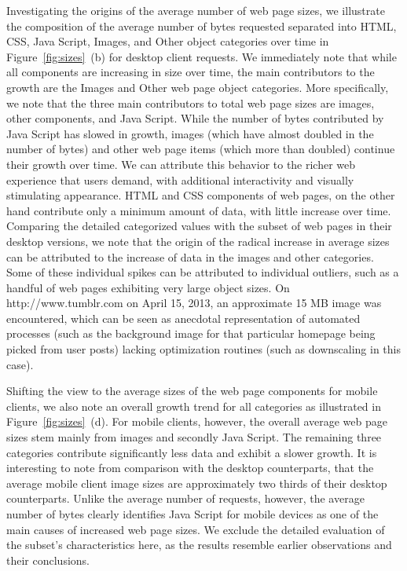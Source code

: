 \documentclass[journal,final]{IEEEtran}
\begin{document}
Investigating the origins of the average number of web page sizes, we illustrate the composition of the average number of bytes requested separated into HTML, CSS, Java Script, Images, and Other object categories over time in Figure~\ref{fig:sizes}~(b) for desktop client requests.
We immediately note that while all components are increasing in size over time, the main contributors to the growth are the Images and Other web page object categories.
More specifically, we note that the three main contributors to total web page sizes are images, other components, and Java Script. 
While the number of bytes contributed by Java Script has slowed in growth, images (which have almost doubled in the number of bytes) and other web page items (which more than doubled) continue their growth over time.
We can attribute this behavior to the richer web experience that users demand, with additional interactivity and visually stimulating appearance.
HTML and CSS components of web pages, on the other hand contribute only a minimum amount of data, with little increase over time.
Comparing the detailed categorized values with the subset of web pages in their desktop versions, we note that the origin of the radical increase in average sizes can be attributed to the increase of data in the images and other categories.
Some of these individual spikes can be attributed to individual outliers, such as a handful of web pages exhibiting very large object sizes. On http://www.tumblr.com on April 15, 2013, an approximate 15 MB image was encountered, which can be seen as anecdotal representation of automated processes (such as the background image for that particular homepage being picked from user posts) lacking optimization routines (such as downscaling in this case).


Shifting the view to the average sizes of the web page components for mobile clients, we also note an overall growth trend for all categories as illustrated in Figure~\ref{fig:sizes}~(d).
For mobile clients, however, the overall average web page sizes stem mainly from images and secondly Java Script. 
The remaining three categories contribute significantly less data and exhibit a slower growth.
It is interesting to note from comparison with the desktop counterparts, that the average mobile client image sizes are approximately two thirds of their desktop counterparts.
Unlike the average number of requests, however, the average number of bytes clearly identifies Java Script for mobile devices as one of the main causes of increased web page sizes. 
We exclude the detailed evaluation of the subset's characteristics here, as the results resemble earlier observations and their conclusions.
\end{document}

